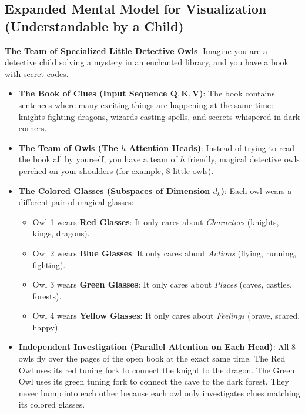 \documentclass[11pt,a4paper]{article}
\theoremstyle{definition}
\begin{document}
\subsection{Expanded Mental Model for Visualization (Understandable by a Child)}
\textbf{The Team of Specialized Little Detective Owls}:
Imagine you are a detective child solving a mystery in an enchanted library, and you have a book with secret codes.

\begin{itemize}
    \item \textbf{The Book of Clues (Input Sequence $\mathbf{Q}, \mathbf{K}, \mathbf{V}$)}:
    The book contains sentences where many exciting things are happening at the same time: knights fighting dragons, wizards casting spells, and secrets whispered in dark corners.
    
    \item \textbf{The Team of Owls (The $h$ Attention Heads)}:
    Instead of trying to read the book all by yourself, you have a team of $h$ friendly, magical detective owls perched on your shoulders (for example, 8 little owls).
    
    \item \textbf{The Colored Glasses (Subspaces of Dimension $d_k$)}:
    Each owl wears a different pair of magical glasses:
    \begin{itemize}
        \item Owl 1 wears \textbf{Red Glasses}: It only cares about \emph{Characters} (knights, kings, dragons).
        \item Owl 2 wears \textbf{Blue Glasses}: It only cares about \emph{Actions} (flying, running, fighting).
        \item Owl 3 wears \textbf{Green Glasses}: It only cares about \emph{Places} (caves, castles, forests).
        \item Owl 4 wears \textbf{Yellow Glasses}: It only cares about \emph{Feelings} (brave, scared, happy).
    \end{itemize}
    
    \item \textbf{Independent Investigation (Parallel Attention on Each Head)}:
    All 8 owls fly over the pages of the open book at the exact same time. The Red Owl uses its red tuning fork to connect the knight to the dragon. The Green Owl uses its green tuning fork to connect the cave to the dark forest. They never bump into each other because each owl only investigates clues matching its colored glasses.
    

\end{itemize}
\end{document}
